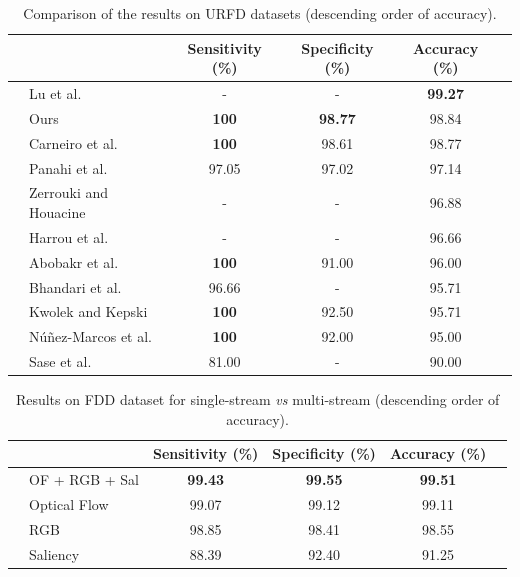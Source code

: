 \documentclass[10pt, conference, compsocconf]{IEEEtran}
\begin{document}
\begin{table}[!htb]
\centering
\caption{Comparison of the results on URFD datasets (descending order of accuracy).}
\label{tab:urfd-our-their}
\begin{tabular}{llcccl}
\hline
 &                                                      & Sensitivity (\%)  & Specificity (\%)  & Accuracy (\%)     & \\ \hline
 & Lu et al.~\cite{lu2018deep}                          & -                 & -                 & \textbf{99.27}    & \\
 & Ours                                                 & \textbf{100}      & \textbf{98.77}    & 98.84             & \\
 & Carneiro et al.~\cite{carneiro2019multi}                                                 & \textbf{100}      & 98.61    & 98.77             & \\
 & Panahi et al.~\cite{panahi2018human}                 & 97.05             & 97.02             & 97.14             & \\
 & Zerrouki and Houacine~\cite{zerrouki2018combined}    & -                 & -                 & 96.88             & \\
 & Harrou et al.~\cite{harrou2017vision}                & -                 & -                 & 96.66             & \\
 & Abobakr et al.~\cite{abobakr2017skeleton}            & \textbf{100}      & 91.00              & 96.00             & \\
 & Bhandari et al.~\cite{bhandari2017novel}             & 96.66             & -                 & 95.71             & \\
 & Kwolek and Kepski~\cite{kwolek2015improving}         & \textbf{100}      & 92.50             & 95.71             & \\
 & N\'u\~nez-Marcos et al.~\cite{nunez2017vision}       & \textbf{100}      & 92.00             & 95.00             & \\
 & Sase et al.~\cite{sase2018human}                     & 81.00             & -                 & 90.00             & \\ \hline
\end{tabular}
\end{table}

\begin{table}[!htb]
\centering
\caption{Results on FDD dataset for single-stream \textit{vs} multi-stream (descending order of accuracy).}
\label{tab:fdd-ensem}
\begin{tabular}{llcccl}
\hline
 &  & Sensitivity (\%) & Specificity (\%) & Accuracy (\%) &  \\ \hline
 & OF + RGB + Sal & \textbf{99.43} & \textbf{99.55} & \textbf{99.51} &  \\
 & Optical Flow & 99.07             & 99.12             & 99.11             &  \\
 & RGB & 98.85             & 98.41             & 98.55             &  \\
 & Saliency & 88.39             & 92.40             & 91.25             & \\ \hline
\end{tabular}
\end{table}
\end{document}
